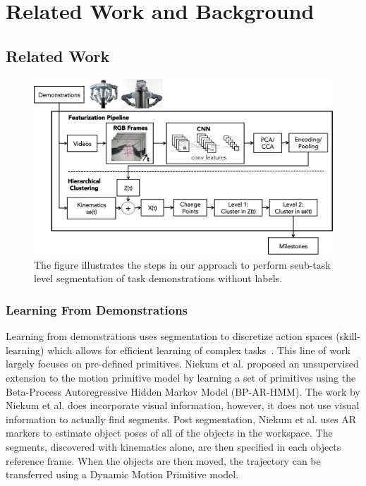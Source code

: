 \section{Related Work and Background}

\subsection{Related Work}
\begin{figure}[!t]
\centering
\includegraphics[width=0.7\linewidth]{figures/system_architecture_2.png}
\caption{ The figure illustrates the steps in our approach to perform seub-task level segmentation of task demonstrations without labels.}
\label{fig:pipeline}
\vspace{-10pt}
\end{figure}

\subsubsection{Learning From Demonstrations}
Learning from demonstrations uses segmentation to discretize action spaces (skill-learning) which allows for efficient learning of complex tasks~\cite{ijspreet2002learning,pastor2009learning}.
This line of work largely focuses on pre-defined primitives.
Niekum et al. \cite{niekum2012learning} proposed an unsupervised extension to the motion primitive model by learning a set of primitives using the Beta-Process Autoregressive Hidden Markov Model (BP-AR-HMM).
The work by Niekum et al. does incorporate visual information, however, it does not use visual information to actually find segments.
Post segmentation,  Niekum et al. uses AR markers to estimate object poses of all of the objects in the workspace.
The segments, discovered with kinematics alone, are then specified in each objects reference frame.
When the objects are then moved, the trajectory can be transferred using a Dynamic Motion Primitive model.

